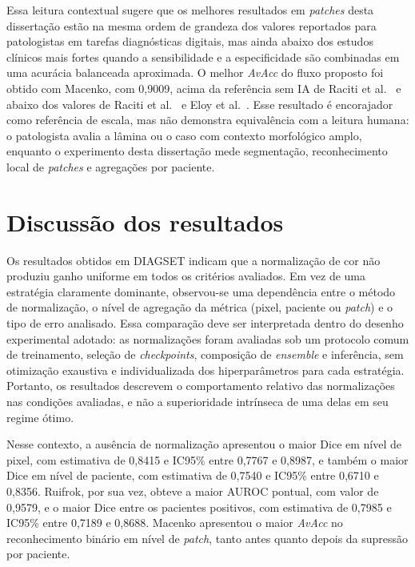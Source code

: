 Essa leitura contextual sugere que os melhores resultados em \textit{patches}
desta dissertação estão na mesma ordem de grandeza dos valores reportados para
patologistas em tarefas diagnósticas digitais, mas ainda abaixo dos estudos
clínicos mais fortes quando a sensibilidade e a especificidade são combinadas em
uma acurácia balanceada aproximada. O melhor \textit{AvAcc} do fluxo proposto
foi obtido com Macenko, com 0{,}9009, acima da referência sem IA de Raciti et
al.~\cite{raciti2020novel} e abaixo dos valores de Raciti et
al.~\cite{raciti2023clinical} e Eloy et al.~\cite{eloy2023artificial}. Esse
resultado é encorajador como referência de escala, mas não demonstra
equivalência com a leitura humana: o patologista avalia a lâmina ou o caso com
contexto morfológico amplo, enquanto o experimento desta dissertação mede
segmentação, reconhecimento local de \textit{patches} e agregações por paciente.

\section{Discussão dos resultados}\label{sec:res_diagset_discussao}

Os resultados obtidos em DIAGSET indicam que a normalização de cor não produziu ganho uniforme em todos os critérios avaliados. Em vez de uma estratégia claramente dominante, observou-se uma dependência entre o método de normalização, o nível de agregação da métrica (pixel, paciente ou \textit{patch}) e o tipo de erro analisado. Essa comparação deve ser interpretada dentro do desenho experimental adotado: as normalizações foram avaliadas sob um protocolo comum de treinamento, seleção de \textit{checkpoints}, composição de \textit{ensemble} e inferência, sem otimização exaustiva e individualizada dos hiperparâmetros para cada estratégia. Portanto, os resultados descrevem o comportamento relativo das normalizações nas condições avaliadas, e não a superioridade intrínseca de uma delas em seu regime ótimo. 

Nesse contexto, a ausência de normalização apresentou o maior Dice em nível de pixel, com estimativa de 0{,}8415 e IC95\% entre 0{,}7767 e 0{,}8987, e também o maior Dice em nível de paciente, com estimativa de 0{,}7540 e IC95\% entre 0{,}6710 e 0{,}8356. Ruifrok, por sua vez, obteve a maior AUROC pontual, com valor de 0{,}9579, e o maior Dice entre os pacientes positivos, com estimativa de 0{,}7985 e IC95\% entre 0{,}7189 e 0{,}8688. Macenko apresentou o maior \textit{AvAcc} no reconhecimento binário em nível de \textit{patch}, tanto antes quanto depois da supressão por paciente.

